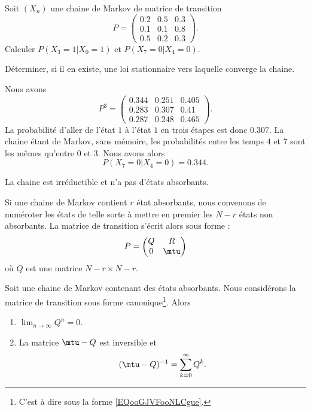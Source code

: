 \begin{example}
	Soit \( (X_n)\) une chaine de Markov de matrice de transition
	\begin{equation}
		P=\begin{pmatrix}
			0.2 & 0.5 & 0.3 \\
			0.1 & 0.1 & 0.8 \\
			0.5 & 0.2 & 0.3
		\end{pmatrix}.
	\end{equation}
	Calculer \( P(X_3=1|X_0=1)\) et \( P(X_7=0|X_4=0)\).

	Déterminer, si il en existe, une loi stationnaire vers laquelle converge la chaine.

	Nous avons
	\begin{equation}
		P^3=\begin{pmatrix}
			0.344 & 0.251 & 0.405 \\
			0.283 & 0.307 & 0.41  \\
			0.287 & 0.248 & 0.465
		\end{pmatrix}.
	\end{equation}
	La probabilité d'aller de l'état \( 1\) à l'état \( 1\) en trois étapes est donc \( 0.307\). La chaine étant de Markov, sans mémoire, les probabilités entre les temps \( 4\) et \( 7\) sont les mêmes qu'entre \( 0\) et \( 3\). Nous avons alors
	\begin{equation}
		P(X_7=0|X_4=0)=0.344.
	\end{equation}

	La chaine est irréductible et n'a pas d'états absorbants.
\end{example}

Si une chaine de Markov contient \( r\) état absorbants, nous convenons de numéroter les états de telle sorte à mettre en premier les \( N-r\) états non absorbants. La matrice de transition s'écrit alors sous forme  :
\begin{equation}        \label{EQooGJVFooNLCgue}
    P=\begin{pmatrix}
        Q    &   R    \\ 
        0    &   \mtu    
    \end{pmatrix}
\end{equation}
où \( Q\) est une matrice \( N-r\times N-r\).

\begin{proposition}     \label{PROPooUNBDooVhXZxi}
    Soit une chaine de Markov contenant des états absorbants. Nous considérons la matrice de transition sous forme canonique\footnote{C'est à dire sous la forme \eqref{EQooGJVFooNLCgue}.}. Alors
    \begin{enumerate}
        \item
            \( \lim_{n\to \infty} Q^n=0\).
        \item
            La matrice \( \mtu-Q\) est inversible et
            \begin{equation}
                (\mtu-Q)^{-1}=\sum_{k=0}^{\infty}Q^k.
            \end{equation}
    \end{enumerate}
\end{proposition}


